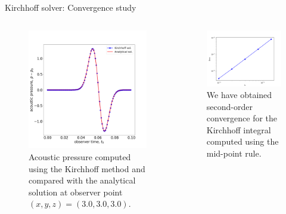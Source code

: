 \documentclass[10pt, aspectratio=169]{beamer}
\begin{document}
\begin{frame}{Kirchhoff solver: Convergence study}
	\begin{columns}
		\begin{figure}
			\centering
			\includegraphics[scale=0.14]{images/Pressure.png}
			\caption*{Acoustic pressure computed using the Kirchhoff method and compared with the analytical solution at observer point $(x, y, z) = (3.0, 3.0, 3.0).$}
		\end{figure}
		\begin{figure}
			\centering
			\includegraphics[scale=0.4]{images/convergence.png}
			\caption*{We have obtained second-order convergence for the Kirchhoff integral computed using the mid-point rule.}
		\end{figure}
	\end{columns}
\end{frame}
\end{document}
